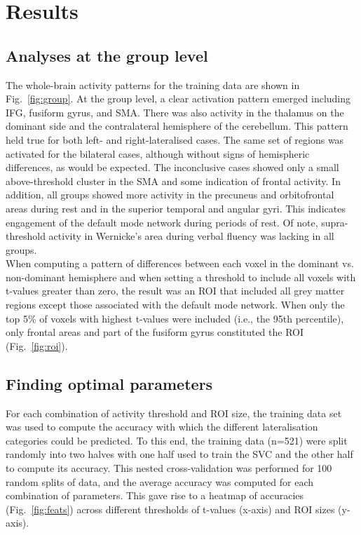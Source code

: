 \documentclass[fleqn,10pt]{SelfArx} %
\begin{document}
\section{Results}

\subsection{Analyses at the group level}
The whole-brain activity patterns for the training data are shown in Fig.~\ref{fig:group}. At the group level, a clear activation pattern emerged including IFG, fusiform gyrus, and SMA. There was also activity in the thalamus on the dominant side and the contralateral hemisphere of the cerebellum. This pattern held true for both left- and right-lateralised cases. The same set of regions was activated for the bilateral cases, although without signs of hemispheric differences, as would be expected. The inconclusive cases showed only a small above-threshold cluster in the SMA and some indication of frontal activity. In addition, all groups showed more activity in the precuneus and orbitofrontal areas during rest and in the superior temporal and angular gyri. This indicates engagement of the default mode network during periods of rest. Of note, supra-threshold activity in Wernicke’s area during verbal fluency was lacking in all groups.\\
When computing a pattern of differences between each voxel in the dominant vs. non-dominant hemisphere and when setting a threshold to include all voxels with t-values greater than zero, the result was an ROI that included all grey matter regions except those associated with the default mode network. When only the top 5\% of voxels with highest t-values were included (i.e., the 95th percentile), only frontal areas and part of the fusiform gyrus constituted the ROI (Fig.~\ref{fig:roi}).

\subsection{Finding optimal parameters}
For each combination of activity threshold and ROI size, the training data set was used to compute the accuracy with which the different lateralisation categories could be predicted. To this end, the training data (n=521) were split randomly into two halves with one half used to train the SVC and the other half to compute its accuracy. This nested cross-validation was performed for 100 random splits of data, and the average accuracy was computed for each combination of parameters. This gave rise to a heatmap of accuracies (Fig.~\ref{fig:feats}) across different thresholds of t-values (x-axis) and ROI sizes (y-axis).
\end{document}

